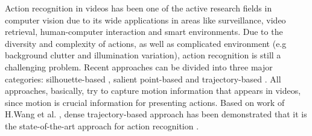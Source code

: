 \documentclass[final,3p,times,twocolumn]{elsarticle}
\begin{document}
Action recognition in videos has been one of the active research fields in computer vision \cite{pirsiavash2012detecting, poppe2010survey} due to its wide applications in areas like surveillance, video retrieval, human-computer interaction and smart environments.
Due to the diversity and complexity of actions, as well as complicated environment (e.g background clutter and illumination variation), action recognition is still a challenging problem.
Recent approaches can be divided into three major categories: silhouette-based \cite{blank2005actions, ke2007event, vitaladevuni2008action, yilmaz2005actions}, salient point-based \cite{laptev2005space, dollar2005behavior, laptev2008learning, bregonzio2009recognising, klaser2008aspatiotemporal, willems2008efficient} and trajectory-based \cite{matikainen2009trajectons, messing2009activity, sun2009hierarchical}.
All approaches, basically, try to capture motion information that appears in videos, since motion is crucial information for presenting actions.
Based on work of H.Wang et al. \cite{wang2011densetraj}, dense trajectory-based approach has been demonstrated that it is the state-of-the-art approach for action recognition \cite{phan2014multimedia, oneata2012axes, natarajan2012bbn}.
\end{document}
